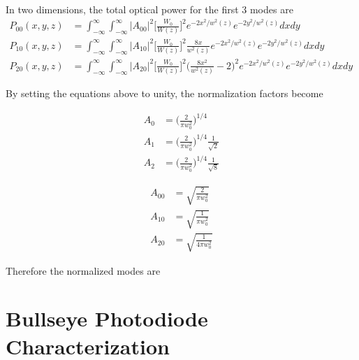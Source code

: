 \begin{appendices}
	In two dimensions, the total optical power for the first 3 modes are
	\begin{equation}
	\label{HGNormalInt2D}
	\begin{aligned}
		P_{00}(x,y,z) 	& 	=	 \int_{-\infty}^{\infty} \int_{-\infty}^{\infty}  \vert A_{00} \vert^2   \bigg[ \frac{W_0}{W(z)} \bigg]^2 e^{-2x^2/w^2(z)}e^{-2y^2/w^2(z)} dx dy&
	\\	P_{10}(x,y,z)	&	=	\int_{-\infty}^{\infty} \int_{-\infty}^{\infty}  \vert A_{10} \vert^2  \bigg[ \frac{W_0}{W(z)} \bigg]^2 \frac{8x}{w^2(z)} e^{-2x^2/w^2(z)}e^{-2y^2/w^2(z)} dx dy&
	\\	P_{20}(x,y,z)	&	= 	\int_{-\infty}^{\infty} \int_{-\infty}^{\infty}  \vert A_{20} \vert^2   \bigg[ \frac{W_0}{W(z)} \bigg]^2 \bigg(\frac{8x^2}{w^2(z)} - 2\bigg)^2 e^{-2x^2/w^2(z)}e^{-2y^2/w^2(z)} dx dy
	\end{aligned}
	\end{equation}
	
	By setting the equations above to unity, the normalization factors become
	
	\begin{equation}
	\begin{aligned}
		A_{0} &	= \bigg( \frac{2}{\pi w_0^2} \bigg)^{1/4} 
	\\	A_{1} &	= \bigg( \frac{2}{\pi w_0^2} \bigg)^{1/4} \frac{1}{\sqrt{2}}
	\\	A_{2} &	= \bigg( \frac{2}{\pi w_0^2} \bigg)^{1/4} \frac{1}{\sqrt{8}}
	\end{aligned}
	\end{equation}
	
	\begin{equation}
	\begin{aligned}
		A_{00} &	= \sqrt{\frac{2}{\pi w_0^2}}
	\\	A_{10} &	= \sqrt{\frac{1}{\pi w_0^2}}
	\\	A_{20} &	= \sqrt{\frac{1}{4\pi w_0^2}}
	\end{aligned}
	\end{equation}
	
	Therefore the normalized modes are
	
	
	
	


	
	

	
	
	
	\chapter{Bullseye Photodiode Characterization}\label{BPDchar}
	

\end{appendices}
